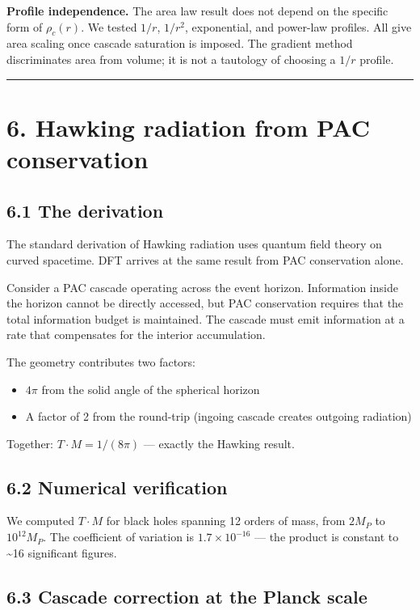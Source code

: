 \documentclass[11pt,a4paper]{article}
\providecommand{\tightlist}{\setlength{\itemsep}{0pt}\setlength{\parskip}{0pt}}
\begin{document}
\textbf{Profile independence.} The area law result does not depend on the specific form of $\rho_c(r)$. We tested $1/r$, $1/r^2$, exponential, and power-law profiles. All give area scaling once cascade saturation is imposed. The gradient method discriminates area from volume; it is not a tautology of choosing a $1/r$ profile.

\begin{center}\rule{0.5\linewidth}{0.4pt}\end{center}

\section*{6. Hawking radiation from PAC conservation}

\subsection*{6.1 The derivation}

The standard derivation of Hawking radiation uses quantum field theory on curved spacetime. DFT arrives at the same result from PAC conservation alone.

Consider a PAC cascade operating across the event horizon. Information inside the horizon cannot be directly accessed, but PAC conservation requires that the total information budget is maintained. The cascade must emit information at a rate that compensates for the interior accumulation.

The geometry contributes two factors:
\begin{itemize}\tightlist
\item $4\pi$ from the solid angle of the spherical horizon
\item A factor of 2 from the round-trip (ingoing cascade creates outgoing radiation)
\end{itemize}

Together: $T \cdot M = 1/(8\pi)$ — exactly the Hawking result.

\subsection*{6.2 Numerical verification}

We computed $T \cdot M$ for black holes spanning 12 orders of mass, from $2 M_P$ to $10^{12} M_P$. The coefficient of variation is $1.7 \times 10^{-16}$ — the product is constant to \textasciitilde{}16 significant figures.

\subsection*{6.3 Cascade correction at the Planck scale}
\end{document}
